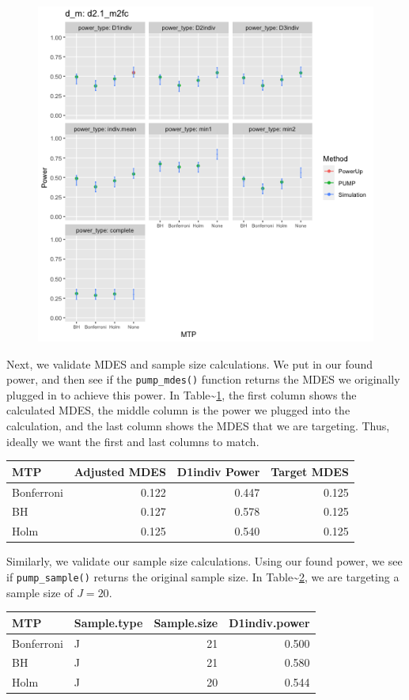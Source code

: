 \documentclass[
]{article}
\begin{document}
\begin{figure}
  \includegraphics[width=\linewidth]{example_validation_plot.png}
  \label{fig:validate}
\end{figure}

Next, we validate MDES and sample size calculations. We put in our found
power, and then see if the \texttt{pump\_mdes()} function returns the
MDES we originally plugged in to achieve this power. In
Table\textasciitilde{}\ref{tab:mdes}, the first column shows the
calculated MDES, the middle column is the power we plugged into the
calculation, and the last column shows the MDES that we are targeting.
Thus, ideally we want the first and last columns to match.

\begin{table}
\centering
\begin{tabular}{lrrr}
MTP & Adjusted MDES & D1indiv Power & Target MDES\\
\hline
Bonferroni & 0.122 & 0.447 & 0.125\\
BH & 0.127 & 0.578 & 0.125\\
Holm & 0.125 & 0.540 & 0.125
\end{tabular}
\label{tab:mdes}
\end{table}

Similarly, we validate our sample size calculations. Using our found
power, we see if \texttt{pump\_sample()} returns the original sample
size. In Table\textasciitilde{}\ref{tab:ss}, we are targeting a sample
size of \(J = 20\).

\begin{table}
\centering
\begin{tabular}{llrr}
MTP & Sample.type & Sample.size & D1indiv.power\\
\hline
Bonferroni & J & 21 & 0.500\\
BH & J & 21 & 0.580\\
Holm & J & 20 & 0.544
\end{tabular}
\label{tab:ss}
\end{table}
\end{document}
